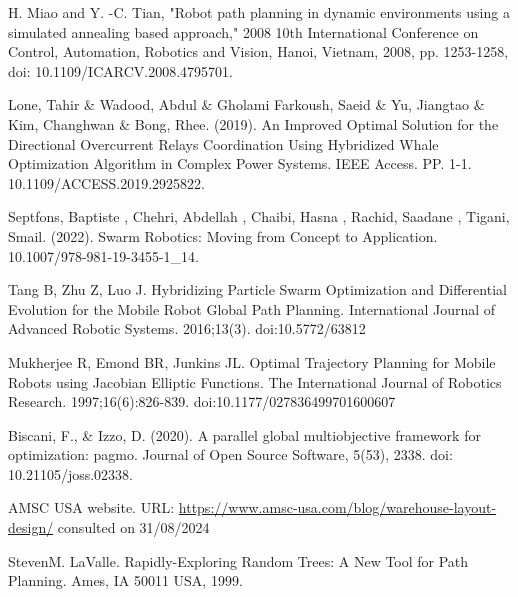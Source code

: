 \begin{thebibliography}{9}
H. Miao and Y. -C. Tian, "Robot path planning in dynamic environments using a simulated annealing based approach," 
2008 10th International Conference on Control, Automation, Robotics and Vision, Hanoi, Vietnam, 2008, pp. 1253-1258, 
doi: 10.1109/ICARCV.2008.4795701. 

Lone, Tahir \& Wadood, Abdul \& Gholami Farkoush, Saeid \& Yu, Jiangtao \& Kim, Changhwan \& Bong, Rhee. (2019). 
An Improved Optimal Solution for the Directional Overcurrent Relays Coordination Using Hybridized Whale Optimization Algorithm in Complex Power Systems. IEEE Access. PP. 1-1. 10.1109/ACCESS.2019.2925822. 

Septfons, Baptiste , Chehri, Abdellah , Chaibi, Hasna , Rachid, Saadane , Tigani, Smail. (2022). 
Swarm Robotics: Moving from Concept to Application. 10.1007/978-981-19-3455-1\_14.

Tang B, Zhu Z, Luo J. Hybridizing Particle Swarm Optimization and Differential Evolution for the Mobile Robot Global 
Path Planning. International Journal of Advanced Robotic Systems. 2016;13(3). doi:10.5772/63812

Mukherjee R, Emond BR, Junkins JL. Optimal Trajectory Planning for Mobile Robots using Jacobian Elliptic Functions. 
The International Journal of Robotics Research. 1997;16(6):826-839. doi:10.1177/027836499701600607

Biscani, F., \& Izzo, D. (2020). A parallel global multiobjective framework for optimization: pagmo. 
Journal of Open Source Software, 5(53), 2338. doi: 10.21105/joss.02338.

AMSC USA website. URL: \url{https://www.amsc-usa.com/blog/warehouse-layout-design/} consulted on 31/08/2024

StevenM. LaValle. Rapidly-Exploring Random Trees: A New Tool
for Path Planning. Ames, IA 50011 USA, 1999.

\end{thebibliography}


